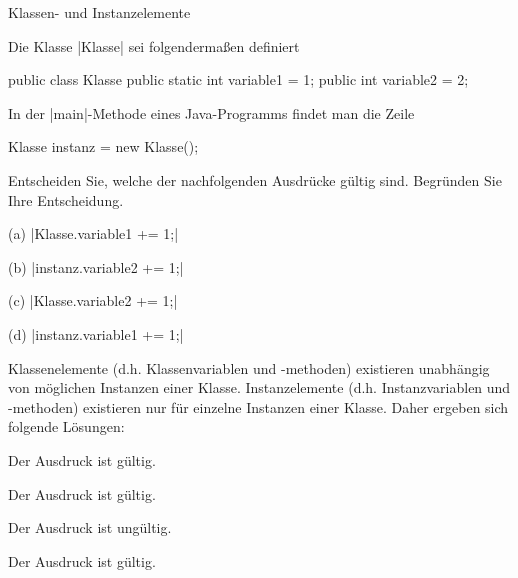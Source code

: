 \begin{exercise}{Klassen- und Instanzelemente}

\begin{body}
Die Klasse \code|Klasse| sei folgendermaßen definiert
\medskip
\begin{displaycode}
public class Klasse {
    public static int variable1 = 1;
    public int variable2 = 2;
}
\end{displaycode}
\medskip
In der \code|main|-Methode eines Java-Programms findet man die Zeile
\medskip
\begin{displaycode}
        Klasse instanz = new Klasse();
\end{displaycode}
\medskip
Entscheiden Sie, welche der nachfolgenden Ausdrücke gültig sind. Begründen Sie Ihre Entscheidung.
\begin{center}
\begin{minipage}{0.45\textwidth}
\begin{parts}
\item[(a)]
\code|Klasse.variable1 += 1;|

\item[(b)]
\code|instanz.variable2 += 1;|
\end{parts}
\end{minipage}
\begin{minipage}{0.45\textwidth}
\begin{parts}
\item[(c)]
\code|Klasse.variable2 += 1;|

\item[(d)]
\code|instanz.variable1 += 1;|
\end{parts}
\end{minipage}
\end{center}
\end{body}

\begin{solution}
Klassenelemente (d.h{.} Klassenvariablen und -methoden) existieren unabhängig von möglichen Instanzen einer Klasse. Instanzelemente (d.h{.} Instanzvariablen und -methoden) existieren nur für einzelne Instanzen einer Klasse. Daher ergeben sich folgende Lösungen:
\begin{parts}
\item
Der Ausdruck ist gültig.

\item
Der Ausdruck ist gültig. 

\item
Der Ausdruck ist ungültig.

\item
Der Ausdruck ist gültig. 
\end{parts}
\end{solution}
\end{exercise}
